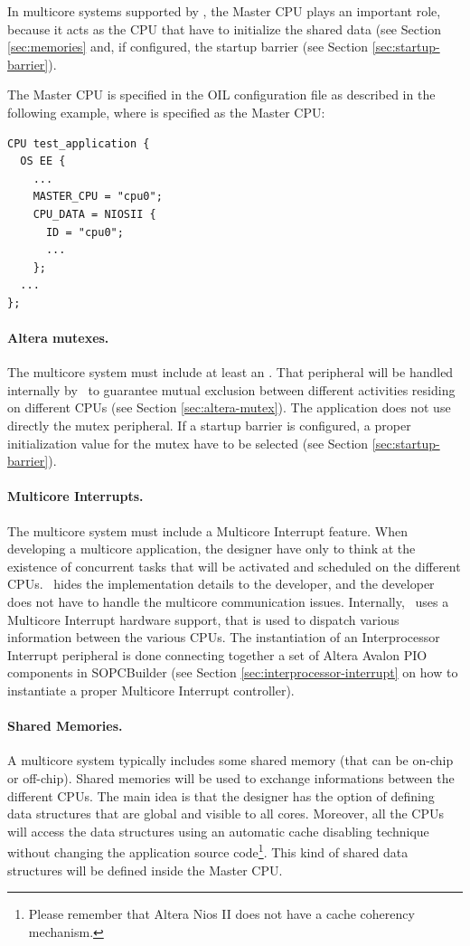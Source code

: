 In multicore systems supported by \ee, the Master CPU plays an
important role, because it acts as the CPU that have to initialize the
shared data (see Section \ref{sec:memories} and, if configured, the
startup barrier (see Section \ref{sec:startup-barrier}).

The Master CPU is specified in the OIL configuration file as described
in the following example, where  is specified as the Master CPU:

\begin{lstlisting}
CPU test_application {
  OS EE {
    ...
    MASTER_CPU = "cpu0";			
    CPU_DATA = NIOSII {
      ID = "cpu0";
      ...
    };
  ...
};
\end{lstlisting}

\paragraph{Altera mutexes.}
The multicore system must include at least an . That peripheral will be handled internally by \ee\
to guarantee mutual exclusion between different activities residing on
different CPUs (see Section \ref{sec:altera-mutex}). The application
does not use directly the mutex peripheral. If a startup barrier is
configured, a proper initialization value for the mutex have to be
selected (see Section \ref{sec:startup-barrier}).

\paragraph{Multicore Interrupts.}
The multicore system must include a Multicore Interrupt feature. When
developing a multicore application, the designer have only to think at
the existence of concurrent tasks that will be activated and scheduled
on the different CPUs. \ee\ hides the implementation details to the
developer, and the developer does not have to handle the multicore
communication issues. Internally, \ee\ uses a Multicore Interrupt
hardware support, that is used to dispatch various information between
the various CPUs. The instantiation of an Interprocessor Interrupt
peripheral is done connecting together a set of Altera Avalon PIO
components in SOPCBuilder (see Section
\ref{sec:interprocessor-interrupt} on how to instantiate a proper
Multicore Interrupt controller).

\paragraph{Shared Memories.}
A multicore system typically includes some shared memory (that can be
on-chip or off-chip). Shared memories will be used to exchange
informations between the different CPUs. The main idea is that the
designer has the option of defining data structures that are global
and visible to all cores. Moreover, all the CPUs will access the data
structures using an automatic cache disabling technique without
changing the application source code\footnote{Please remember that
Altera Nios II does not have a cache coherency mechanism.}. This kind
of shared data structures will be defined inside the Master
CPU. 

